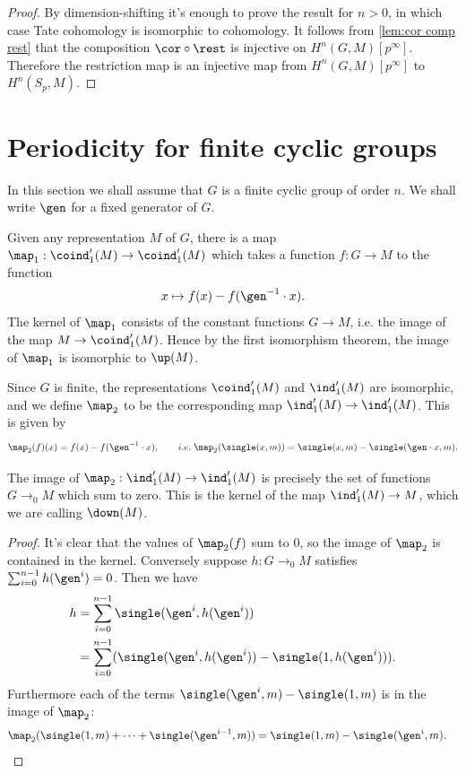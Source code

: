 \begin{proof}
	By dimension-shifting it's enough to prove the result for $n > 0$, in which case
	Tate cohomology is isomorphic to cohomology.
	It follows from \ref{lem:cor comp rest} that the
	composition $\cor \circ \rest$ is injective on $H^n(G,M)[p^\infty]$.
	Therefore the restriction map is an injective map from $H^n(G,M)[p^\infty]$
	to $H^n(S_p,M)$.
\end{proof}






\section{Periodicity for finite cyclic groups}

In this section we shall assume that $G$ is a finite cyclic group of order $n$.
We shall write $\gen$ for a fixed generator of $G$.

Given any representation $M$ of $G$, there is a map
$\map_1 : \coind_1'(M) \to \coind_1'(M)$ which takes a function $f : G \to M$ to the function
\[
	x \mapsto f(x) - f(\gen^{-1}\cdot x).
\]
The kernel of $\map_1$ consists of the constant functions $G \to M$, i.e. the image of the
map $M \to \coind_1'(M)$.
Hence by the first isomorphism theorem, the image of $\map_1$ is isomorphic to $\up(M)$.

Since $G$ is finite, the representations $\coind_1'(M)$ and $\ind_1'(M)$
are isomorphic, and we define $\map_2$ to be the corresponding map $\ind_1'(M) \to \ind_1'(M)$.
This is given by
\[
	\map_2(f) (x) = f(x) - f(\gen^{-1} \cdot x), \qquad i.e.\;
	\map_2(\single(x,m)) = \single(x,m) - \single(\gen \cdot x, m).
\]
\begin{lemma} \label{lem:map2 image}
	\leanok
	The image of $\map_2 : \ind_1'(M) \to \ind_1'(M)$ is precisely the set of functions $G \to_0 M$
	which sum to zero. This is the kernel of the map $\ind_1'(M) \to M$,
	which we are calling $\down(M)$.
\end{lemma}

\begin{proof}
	\leanok
	It's clear that the values of $\map_2(f)$ sum to $0$, so the image of $\map_2$ is contained in
	the kernel.
	Conversely suppose $h : G \to_0 M$ satisfies $\sum_{i=0}^{n-1} h(\gen^i) = 0$.
	Then we have
	\begin{align*}
		h
		& = \sum_{i=0}^{n-1} \single(\gen^i, h(\gen^i))\\
		& = \sum_{i=0}^{n-1} (\single(\gen^i, h(\gen^i)) - \single(1, h(\gen^i))).
	\end{align*}
	Furthermore each of the terms $\single(\gen^i, m) - \single(1, m)$ is in the
	image of $\map_2$:
	\begin{align*}
		\map_2 (\single(1,m) + \cdots + \single(\gen^{i-1},m))
		&=\single(1,m) - \single(\gen^i,m).
	\end{align*}
\end{proof}

